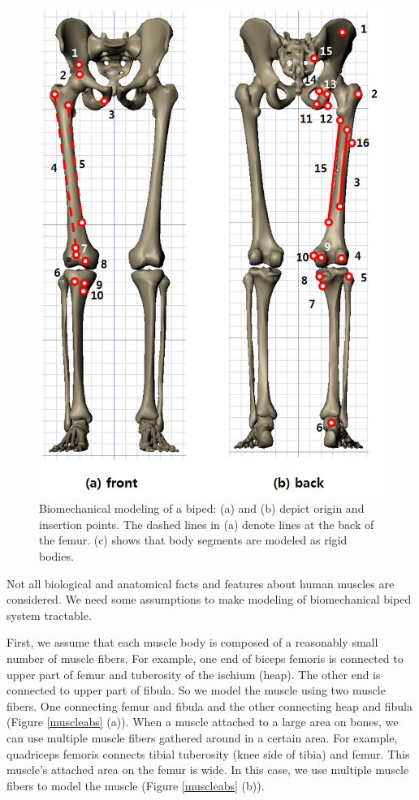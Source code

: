 \documentclass[master,english,final]{kaist-ucs}
\begin{document}
\begin{figure}[h!]
  \centering
  \includegraphics[width=4.8in]{musclepoints}
  \caption[Biomechanical modeling of a biped]
  {Biomechanical modeling of a biped: (a) and (b) depict origin and insertion points.
  The dashed lines in (a) denote lines at the back of the femur.
  (c) shows that body segments are modeled as rigid bodies.
   }
   \label{fig:musclepoints}
\end{figure}

Not all biological and anatomical facts and features about human muscles are considered.
We need some assumptions to make modeling of biomechanical biped system tractable.

First, we assume that each muscle body is composed of a reasonably small number of muscle fibers.
For example, one end of biceps femoris is connected to upper part of femur and tuberosity of the ischium (heap).
The other end is connected to upper part of fibula. So we model
the muscle using two muscle fibers. One connecting femur and fibula and the other connecting
heap and fibula (Figure \ref{muscleabs} (a)).
When a muscle attached to a large area on bones, we can use multiple muscle fibers
gathered around in a certain area. For example,
quadriceps femoris connects tibial tuberosity (knee side of tibia)
and femur. This muscle's attached area on the femur is wide. In this case,
we use multiple muscle fibers to model the muscle (Figure \ref{muscleabs} (b)).
\end{document}
